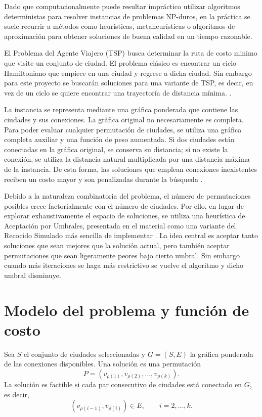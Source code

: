 \documentclass[11pt,a4paper]{article}
\begin{document}
Dado que computacionalmente puede resultar impráctico utilizar
algoritmos deterministas para resolver instancias de problemas
NP-duros, en la práctica se suele recurrir a métodos como heurísticas,
metaheurísticas o algoritmos de aproximación para obtener soluciones
de buena calidad en un tiempo razonable.


El Problema del Agente Viajero (TSP) busca determinar la ruta de costo
minimo que visite un conjunto de ciudad. El problema clásico es
encontrar un ciclo Hamiltoniano que empiece en una ciudad y regrese a
dicha ciudad. Sin embargo para este proyecto se buscarán soluciones
para una variante de TSP, es decir, en vez de un ciclo se quiere
encontrar una trayectoría de distancia mínima. \cite{materialTsp}.


La instancia se representa mediante una gráfica ponderada que contiene
las ciudades y sus conexiones. La gráfica original no necesariamente
es completa. Para poder evaluar cualquier permutación de ciudades, se
utiliza una gráfica completa auxiliar y una función de peso
aumentada. Si dos ciudades están conectadas en la gráfica original, se
conserva su distancia; si no existe la conexión, se utiliza la
distancia natural multiplicada por una distancia máxima de la
instancia. De esta forma, las soluciones que emplean conexiones
inexistentes reciben un costo mayor y son penalizadas durante la
búsqueda \cite{materialTsp}.

Debido a la naturaleza combinatoria del problema, el número de
permutaciones posibles crece factorialmente con el número de
ciudades. Por ello, en lugar de explorar exhaustivamente el espacio de
soluciones, se utiliza una heurística de Aceptación por Umbrales,
presentada en el material como una variante del Recocido Simulado más
sencilla de implementar \cite{materialThreshold}.
La idea central es aceptar tanto soluciones que sean mejores que la solución
actual, pero también aceptar permutaciones que sean ligeramente peores bajo
cierto umbral. Sin embargo cuando más iteraciones se haga más restrictivo se
vuelve el algoritmo y dicho umbral disminuye.

\section{Modelo del problema y función de costo}

Sea $S$ el conjunto de ciudades seleccionadas y $G=(S,E)$ la gráfica
ponderada de las conexiones disponibles. Una solución es una
permutación
\[
P=(v_{\rho(1)},v_{\rho(2)},\ldots,v_{\rho(k)}).
\]
La solución es factible si cada par consecutivo de ciudades está
conectado en $G$, es decir,
\[
(v_{\rho(i-1)},v_{\rho(i)})\in E,\qquad i=2,\ldots,k.
\]
\end{document}
